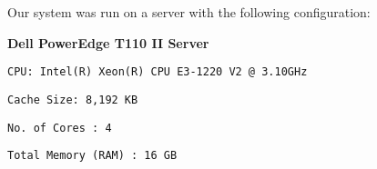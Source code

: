 Our system was run on a server with the following configuration:

\textbf{Dell PowerEdge T110 II Server}

\texttt{CPU: Intel(R) Xeon(R) CPU E3-1220 V2 @ 3.10GHz}

\texttt{Cache Size: 8,192 KB}

\texttt{No. of Cores : 4}

\texttt{Total Memory (RAM) : 16 GB}